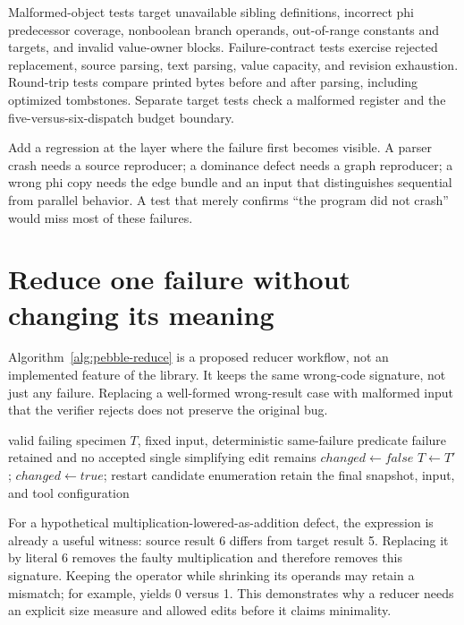 Malformed-object tests target unavailable sibling definitions, incorrect phi predecessor coverage, nonboolean branch operands, out-of-range constants and targets, and invalid value-owner blocks.
Failure-contract tests exercise rejected replacement, source parsing, text parsing, value capacity, and revision exhaustion.
Round-trip tests compare printed bytes before and after parsing, including optimized tombstones.
Separate target tests check a malformed register and the five-versus-six-dispatch budget boundary.

Add a regression at the layer where the failure first becomes visible.
A parser crash needs a source reproducer; a dominance defect needs a graph reproducer; a wrong phi copy needs the edge bundle and an input that distinguishes sequential from parallel behavior.
A test that merely confirms \enquote{the program did not crash} would miss most of these failures.

\section{Reduce one failure without changing its meaning}
\label{sec:pebble-reducer}
Algorithm~\ref{alg:pebble-reduce} is a proposed reducer workflow, not an implemented feature of the library.
It keeps the same wrong-code signature, not just any failure.
Replacing a well-formed wrong-result case with malformed input that the verifier rejects does not preserve the original bug.

\begin{algorithm}[htbp]
\caption{Reducing a wrong-result reproducer while retaining its contract.}
\label{alg:pebble-reduce}
\begin{pseudocode}
\Require valid failing specimen $T$, fixed input, deterministic same-failure predicate
\Ensure failure retained and no accepted single simplifying edit remains
\Repeat
\State $changed\gets false$
\State $T\gets T'$; $changed\gets true$; restart candidate enumeration
\State \Break
\EndIf
\EndFor
{}
\State retain the final snapshot, input, and tool configuration
\end{pseudocode}
\end{algorithm}

For a hypothetical multiplication-lowered-as-addition defect, the expression  is already a useful witness: source result 6 differs from target result 5.
Replacing it by literal 6 removes the faulty multiplication and therefore removes this signature.
Keeping the operator while shrinking its operands may retain a mismatch; for example,  yields 0 versus 1.
This demonstrates why a reducer needs an explicit size measure and allowed edits before it claims minimality.

